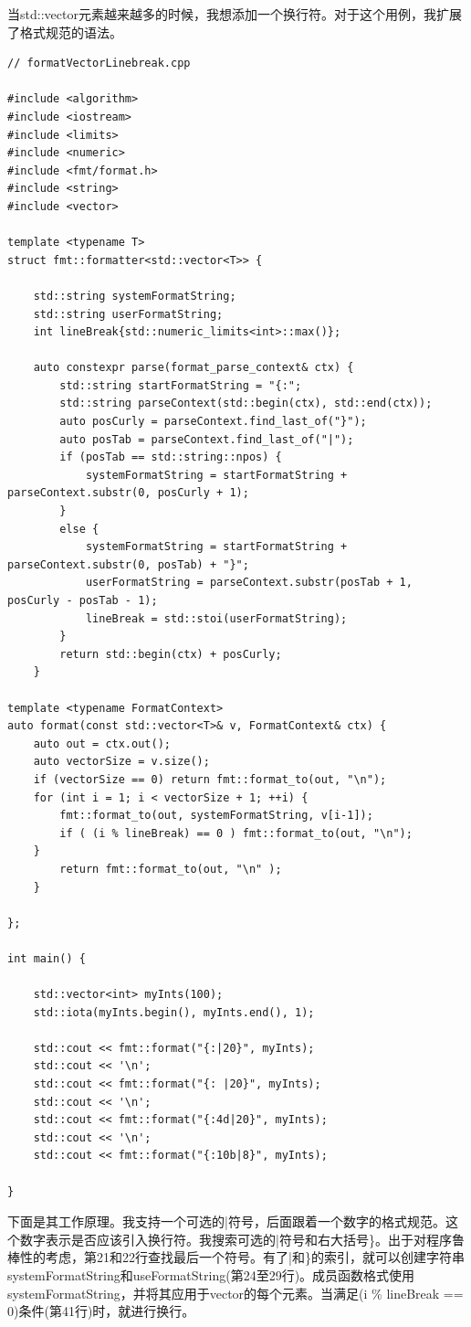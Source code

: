 当std::vector元素越来越多的时候，我想添加一个换行符。对于这个用例，我扩展了格式规范的语法。

\begin{lstlisting}[style=styleCXX]
// formatVectorLinebreak.cpp

#include <algorithm>
#include <iostream>
#include <limits>
#include <numeric>
#include <fmt/format.h>
#include <string>
#include <vector>

template <typename T>
struct fmt::formatter<std::vector<T>> {

	std::string systemFormatString;
	std::string userFormatString;
	int lineBreak{std::numeric_limits<int>::max()};
	
	auto constexpr parse(format_parse_context& ctx) {
		std::string startFormatString = "{:";
		std::string parseContext(std::begin(ctx), std::end(ctx));
		auto posCurly = parseContext.find_last_of("}");
		auto posTab = parseContext.find_last_of("|");
		if (posTab == std::string::npos) {
			systemFormatString = startFormatString + parseContext.substr(0, posCurly + 1);
		}
		else {
			systemFormatString = startFormatString + parseContext.substr(0, posTab) + "}";
			userFormatString = parseContext.substr(posTab + 1, posCurly - posTab - 1);
			lineBreak = std::stoi(userFormatString);
		}
		return std::begin(ctx) + posCurly;
	}

template <typename FormatContext>
auto format(const std::vector<T>& v, FormatContext& ctx) {
	auto out = ctx.out();
	auto vectorSize = v.size();
	if (vectorSize == 0) return fmt::format_to(out, "\n");
	for (int i = 1; i < vectorSize + 1; ++i) {
		fmt::format_to(out, systemFormatString, v[i-1]);
		if ( (i % lineBreak) == 0 ) fmt::format_to(out, "\n");
	}
		return fmt::format_to(out, "\n" );
	}

};

int main() {

	std::vector<int> myInts(100);
	std::iota(myInts.begin(), myInts.end(), 1);
	
	std::cout << fmt::format("{:|20}", myInts);
	std::cout << '\n';
	std::cout << fmt::format("{: |20}", myInts);
	std::cout << '\n';
	std::cout << fmt::format("{:4d|20}", myInts);
	std::cout << '\n';
	std::cout << fmt::format("{:10b|8}", myInts);

}
\end{lstlisting}

下面是其工作原理。我支持一个可选的|符号，后面跟着一个数字的格式规范。这个数字表示是否应该引入换行符。我搜索可选的|符号和右大括号\}。出于对程序鲁棒性的考虑，第21和22行查找最后一个符号。有了|和\}的索引，就可以创建字符串systemFormatString和useFormatString(第24至29行)。成员函数格式使用systemFormatString，并将其应用于vector的每个元素。当满足(i \% lineBreak == 0)条件(第41行)时，就进行换行。


